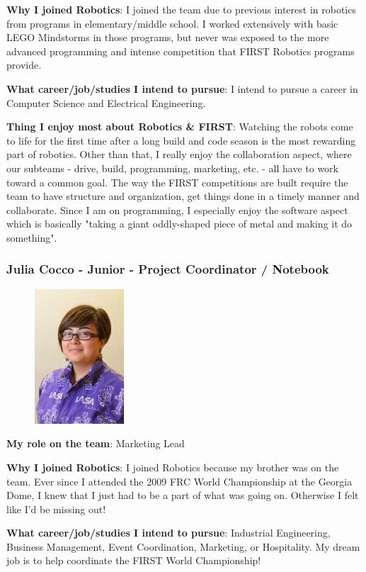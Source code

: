 {\bf Why I joined Robotics}: I joined the team due to previous interest in robotics from programs in elementary/middle school. I worked extensively with basic LEGO Mindstorms in those programs, but never was exposed to the more advanced programming and intense competition that FIRST Robotics programs provide.
	    
{\bf What career/job/studies I intend to pursue}: I intend to pursue a career in Computer Science and Electrical Engineering.
	
{\bf Thing I enjoy most about Robotics \& FIRST}: Watching the robots come to life for the first time after a long build and code season is the most rewarding part of robotics. Other than that, I really enjoy the collaboration aspect, where our subteams - drive, build, programming, marketing, etc. - all have to work toward a common goal.  The way the FIRST competitions are built require the team to have structure and organization, get things done in a timely manner and collaborate. Since I am on programming, I especially enjoy the software aspect which is basically "taking a giant oddly-shaped piece of metal and making it do something".

\subsubsection{Julia Cocco - Junior - Project Coordinator / Notebook}
\begin{figure}[H]
	\includegraphics[width=0.2\linewidth]{julia}
\end{figure}
{\bf My role on the team}: Marketing Lead

{\bf Why I joined Robotics}: I joined Robotics because my brother was on the team. Ever since I attended the 2009 FRC World Championship at the Georgia Dome, I knew that I just had to be a part of what was going on. Otherwise I felt like I'd be missing out! 

{\bf What career/job/studies I intend to pursue}: Industrial Engineering, Business Management, Event Coordination, Marketing, or Hospitality. My dream job is to help coordinate the FIRST World Championship! 

